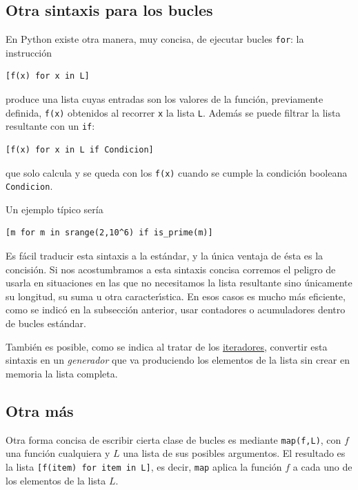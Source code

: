 \subsection{Otra sintaxis para los bucles}\label{bucles2}

En Python existe otra manera, muy concisa, de ejecutar bucles {\tt for}: la
instrucción \label{for-sintaxis2}
\begin{lstlisting}
[f(x) for x in L]
\end{lstlisting}
\noindent produce una lista cuyas entradas son los valores de la función,
previamente definida, \lstinline|f(x)| obtenidos 
al recorrer \lstinline|x| la lista \lstinline|L|. Además se puede filtrar la
lista resultante con un \lstinline|if|:
\begin{lstlisting}
[f(x) for x in L if Condicion]
\end{lstlisting}
\noindent que solo calcula y se queda con los \lstinline|f(x)| cuando se 
cumple la condición
booleana \lstinline|Condicion|. 

Un ejemplo típico sería 
\begin{lstlisting}
[m for m in srange(2,10^6) if is_prime(m)]
\end{lstlisting}




Es f\'acil traducir esta sintaxis a la est\'andar, y la \'unica ventaja de
\'esta es la concisi\'on. Si nos acostumbramos a esta sintaxis concisa corremos
el peligro de usarla en situaciones en las que no necesitamos  la lista
resultante sino \'unicamente su longitud, su suma u otra caracter\'{\i}stica. En
esos casos es mucho m\'as eficiente, como se indic\'o en la subsecci\'on
anterior, usar contadores o acumuladores dentro de
bucles est\'andar. 

Tambi\'en es posible, como se indica al tratar de los
\hyperref[iter2]{iteradores}, convertir esta sintaxis en un {\itshape
generador} que va produciendo los elementos de la lista sin crear en memoria la
lista completa. 

\subsection{Otra m\'as}

Otra forma concisa de escribir cierta clase de bucles es mediante 
\lstinline|map(f,L)|, con $f$ una funci\'on cualquiera y $L$ una lista de sus
posibles argumentos. El resultado es la lista 
\lstinline|[f(item) for item in L]|, es decir, \lstinline|map| aplica la
funci\'on $f$ a cada uno de los elementos de la lista $L$.


